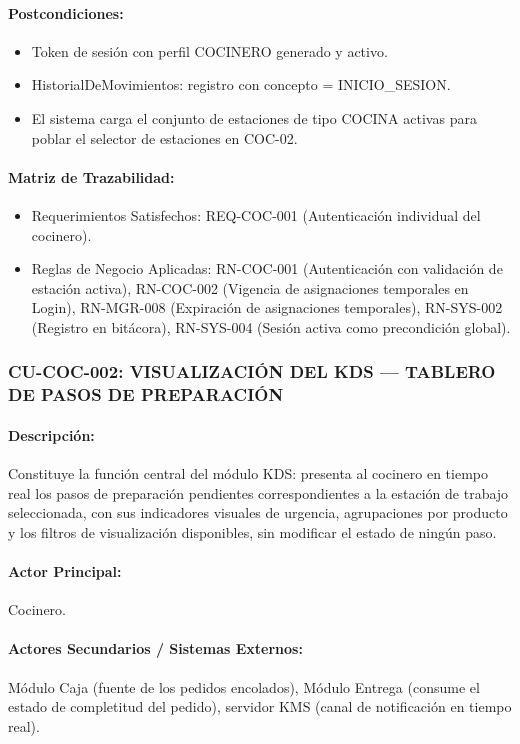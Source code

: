\paragraph{Postcondiciones:}
\begin{itemize}
    \item Token de sesión con perfil COCINERO generado y activo.
    \item HistorialDeMovimientos: registro con concepto = INICIO\_SESION.
    \item El sistema carga el conjunto de estaciones de tipo COCINA activas para poblar el selector de estaciones en COC-02.
\end{itemize}

\paragraph{Matriz de Trazabilidad:}
\begin{itemize}
    \item Requerimientos Satisfechos: REQ-COC-001 (Autenticación individual del cocinero).
    \item Reglas de Negocio Aplicadas: RN-COC-001 (Autenticación con validación de estación activa), RN-COC-002 (Vigencia de asignaciones temporales en Login), RN-MGR-008 (Expiración de asignaciones temporales), RN-SYS-002 (Registro en bitácora), RN-SYS-004 (Sesión activa como precondición global).
\end{itemize}

\subsubsection{CU-COC-002: VISUALIZACIÓN DEL KDS --- TABLERO DE PASOS DE PREPARACIÓN}
\paragraph{Descripción:} Constituye la función central del módulo KDS: presenta al cocinero en tiempo real los pasos de preparación pendientes correspondientes a la estación de trabajo seleccionada, con sus indicadores visuales de urgencia, agrupaciones por producto y los filtros de visualización disponibles, sin modificar el estado de ningún paso.

\paragraph{Actor Principal:} Cocinero.

\paragraph{Actores Secundarios / Sistemas Externos:} Módulo Caja (fuente de los pedidos encolados), Módulo Entrega (consume el estado de completitud del pedido), servidor KMS (canal de notificación en tiempo real).

